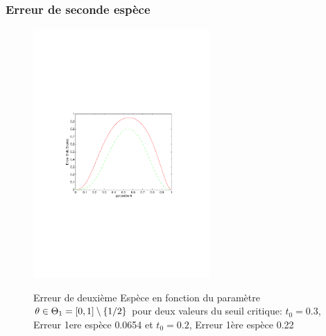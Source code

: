 \begin{frame}
\frametitle{Erreur de seconde espèce}
\begin{figure}
  \centering
  \includegraphics[width=0.6\textwidth]{Erreur2ndEspece}\\
  \caption{Erreur de deuxième Espèce en fonction du paramètre $\theta \in \Theta_1= \left[0,1\right]\setminus \{1/2\}$
  pour deux valeurs du seuil critique: $t_0=0.3$, Erreur 1ere espèce  0.0654 et $t_0= 0.2$, Erreur 1ère espèce 0.22 }
\end{figure}
\end{frame}

